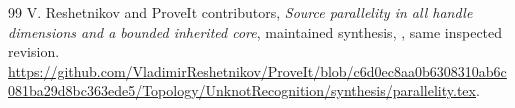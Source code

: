 \documentclass[11pt]{article}
\theoremstyle{definition}\newtheorem{definition}[theorem]{Definition}
\theoremstyle{remark}\newtheorem{remark}[theorem]{Remark}
\begin{document}
\begin{thebibliography}{99}
V. Reshetnikov and ProveIt contributors,
\emph{Source parallelity in all handle dimensions and a bounded inherited core},
maintained synthesis, , same inspected revision.
\url{https://github.com/VladimirReshetnikov/ProveIt/blob/c6d0ec8aa0b6308310ab6c081ba29d8bc363ede5/Topology/UnknotRecognition/synthesis/parallelity.tex}.
\end{thebibliography}
\end{document}
